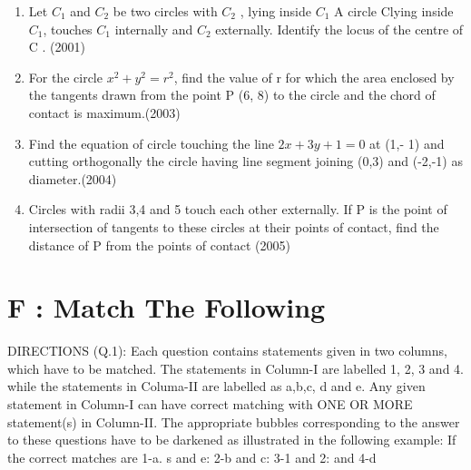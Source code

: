 \documentclass[12pt]{article}
\begin{document}
\begin{enumerate}
\item Let $C_1$ and $C_2$  be two circles with $C_2$ , lying inside $C_1$  A circle  Clying inside $C_1$, touches $C_1$ internally and $C_2$ externally. Identify the locus of the centre of C . (2001)
\item For the circle $x^2+y^2=r^2$, find the value of r for which the area enclosed by the tangents drawn from the point P (6, 8) to the circle and the chord of contact is maximum.(2003)
\item Find the equation of circle touching the line $2x+3y+1=0$ at (1,- 1) and cutting orthogonally the circle having line segment joining (0,3) and (-2,-1) as diameter.(2004)
\item Circles with radii 3,4 and 5 touch each other externally. If P is the point of intersection of tangents to these circles at their points of contact, find the distance of P from the points of contact (2005)

\end{enumerate}


\section*{F  :  Match The Following}
 
 DIRECTIONS (Q.1): Each question contains statements given in two columns, which have to be matched. The statements in Column-I are labelled 1, 2, 3 and 4. while the statements in Columa-II are labelled as a,b,c, d and e. Any given statement in Column-I can have correct matching with ONE OR MORE statement(s) in Column-II. The appropriate bubbles corresponding to the answer to these questions have to be darkened as illustrated in the following example:
If the correct matches are 1-a. s and e: 2-b and c: 3-1 and 2: and 4-d 
\end{document}
